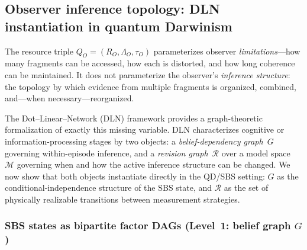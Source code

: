 %
%



\subsection{Observer inference topology: DLN instantiation in quantum Darwinism}
\label{sec:qstates}

The resource triple $Q_O=(R_O,\Lambda_O,\tau_O)$ parameterizes observer
\emph{limitations}---how many fragments can be accessed, how each is
distorted, and how long coherence can be maintained.
It does not parameterize the observer's \emph{inference structure}: the
topology by which evidence from multiple fragments is organized, combined,
and---when necessary---reorganized.

The Dot--Linear--Network (DLN) framework
\citep{WuDLNCompression2026preprint} provides a graph-theoretic
formalization of exactly this missing variable.
DLN characterizes cognitive or information-processing stages by two
objects:
a \emph{belief-dependency graph}~$G$ governing within-episode inference,
and a \emph{revision graph}~$\mathcal{R}$ over a model
space~$\mathcal{M}$ governing when and how the active inference
structure can be changed.
We now show that both objects instantiate directly in the QD/SBS setting:
$G$ as the conditional-independence structure of the SBS state, and
$\mathcal{R}$ as the set of physically realizable transitions between
measurement strategies.


\subsubsection{SBS states as bipartite factor DAGs (Level~1: belief graph $G$)}

